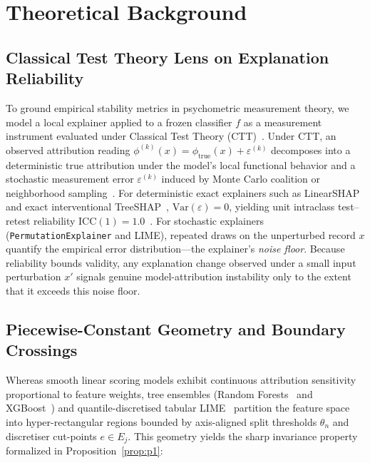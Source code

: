 \documentclass[conference]{IEEEtran}
\begin{document}
\section{Theoretical Background}
\label{sec:theory}

\subsection{Classical Test Theory Lens on Explanation Reliability}
To ground empirical stability metrics in psychometric measurement theory, we model a local explainer applied to a frozen classifier $f$ as a measurement instrument evaluated under Classical Test Theory (CTT)~\cite{novick1966}. Under CTT, an observed attribution reading $\phi^{(k)}(x) = \phi_{\mathrm{true}}(x) + \varepsilon^{(k)}$ decomposes into a deterministic true attribution under the model's local functional behavior and a stochastic measurement error $\varepsilon^{(k)}$ induced by Monte Carlo coalition or neighborhood sampling~\cite{kelodjou2024,nnadi2026}. For deterministic exact explainers such as LinearSHAP and exact interventional TreeSHAP~\cite{lundberg2020}, $\mathrm{Var}(\varepsilon)=0$, yielding unit intraclass test--retest reliability $\mathrm{ICC}(1)=1.0$~\cite{shrout1979}. For stochastic explainers (\texttt{PermutationExplainer} and LIME), repeated draws on the unperturbed record $x$ quantify the empirical error distribution—the explainer's \textit{noise floor}. Because reliability bounds validity, any explanation change observed under a small input perturbation $x'$ signals genuine model-attribution instability only to the extent that it exceeds this noise floor.

\subsection{Piecewise-Constant Geometry and Boundary Crossings}
Whereas smooth linear scoring models exhibit continuous attribution sensitivity proportional to feature weights, tree ensembles (Random Forests~\cite{breiman2001} and XGBoost~\cite{chen2016}) and quantile-discretised tabular LIME~\cite{ribeiro2016} partition the feature space into hyper-rectangular regions bounded by axis-aligned split thresholds $\theta_n$ and discretiser cut-points $e \in E_j$. This geometry yields the sharp invariance property formalized in Proposition~\ref{prop:p1}:
\end{document}
